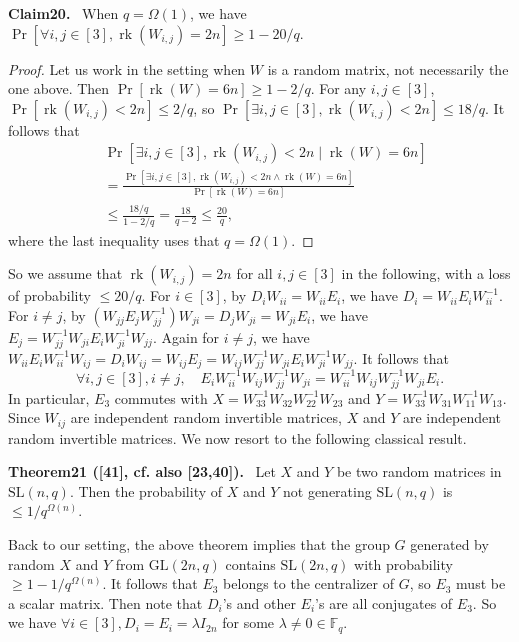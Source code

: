 \documentclass[10pt,a4paper]{article}
\newenvironment{authorclaim}[1]{\par\medskip\noindent\textbf{#1.}\ }{\par\medskip}
\begin{document}
\begin{authorclaim}{Claim20}
When $q=\Omega(1)$, we have $\Pr[\forall i,j\in[3],\operatorname{rk}(W_{i,j})=2n]\ge1-20/q$.
\end{authorclaim}
\begin{proof}
Let us work in the setting when $W$ is a random matrix, not necessarily the one above. Then $\Pr[\operatorname{rk}(W)=6n]\ge1-2/q$. For any $i,j\in[3]$, $\Pr[\operatorname{rk}(W_{i,j})<2n]\le2/q$, so $\Pr[\exists i,j\in[3],\operatorname{rk}(W_{i,j})<2n]\le18/q$. It follows that
\begin{align*}
&\Pr[\exists i,j\in[3],\operatorname{rk}(W_{i,j})<2n\mid\operatorname{rk}(W)=6n]\\
&=\frac{\Pr[\exists i,j\in[3],\operatorname{rk}(W_{i,j})<2n\wedge\operatorname{rk}(W)=6n]}{\Pr[\operatorname{rk}(W)=6n]}\\
&\le\frac{18/q}{1-2/q}=\frac{18}{q-2}\le\frac{20}q,
\end{align*}
where the last inequality uses that $q=\Omega(1)$.
\end{proof}
So we assume that $\operatorname{rk}(W_{i,j})=2n$ for all $i,j\in[3]$ in the following, with a loss of probability $\le20/q$.
For $i\in[3]$, by $D_iW_{ii}=W_{ii}E_i$, we have $D_i=W_{ii}E_iW_{ii}^{-1}$. For $i\ne j$, by $(W_{jj}E_jW_{jj}^{-1})W_{ji}=D_jW_{ji}=W_{ji}E_i$, we have $E_j=W_{jj}^{-1}W_{ji}E_iW_{ji}^{-1}W_{jj}$. Again for $i\ne j$, we have $W_{ii}E_iW_{ii}^{-1}W_{ij}=D_iW_{ij}=W_{ij}E_j=W_{ij}W_{jj}^{-1}W_{ji}E_iW_{ji}^{-1}W_{jj}$. It follows that
\[\forall i,j\in[3],i\ne j,\quad E_iW_{ii}^{-1}W_{ij}W_{jj}^{-1}W_{ji}=W_{ii}^{-1}W_{ij}W_{jj}^{-1}W_{ji}E_i.\]
In particular, $E_3$ commutes with $X=W_{33}^{-1}W_{32}W_{22}^{-1}W_{23}$ and $Y=W_{33}^{-1}W_{31}W_{11}^{-1}W_{13}$. Since $W_{ij}$ are independent random invertible matrices, $X$ and $Y$ are independent random invertible matrices. We now resort to the following classical result.
\begin{authorclaim}{Theorem21 ([41], cf. also [23,40])}
Let $X$ and $Y$ be two random matrices in $\mathrm{SL}(n,q)$. Then the probability of $X$ and $Y$ not generating $\mathrm{SL}(n,q)$ is $\le1/q^{\Omega(n)}$.
\end{authorclaim}
Back to our setting, the above theorem implies that the group $G$ generated by random $X$ and $Y$ from $\mathrm{GL}(2n,q)$ contains $\mathrm{SL}(2n,q)$ with probability $\ge1-1/q^{\Omega(n)}$. It follows that $E_3$ belongs to the centralizer of $G$, so $E_3$ must be a scalar matrix. Then note that $D_i$'s and other $E_i$'s are all conjugates of $E_3$. So we have $\forall i\in[3],D_i=E_i=\lambda I_{2n}$ for some $\lambda\ne0\in\mathbb F_q$.
\end{document}
